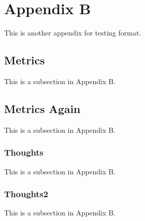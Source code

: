 \clearpage
\section{Appendix B} \label{appendixB}

This is another appendix for testing format.

\subsection{Metrics} \label{metrics}
This is a subsection in Appendix B.

\subsection{Metrics Again} \label{metricsagain}
This is a subsection in Appendix B.

\subsubsection{Thoughts} \label{thoughts}
This is a subsection in Appendix B.

\subsubsection{Thoughts2} \label{thoughts2}
This is a subsection in Appendix B.

